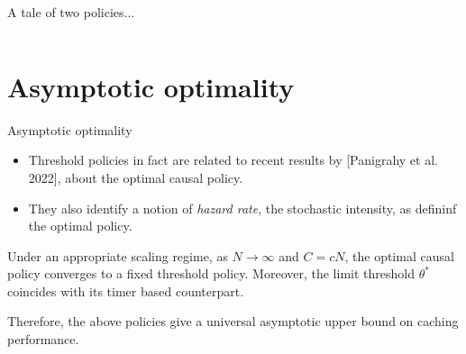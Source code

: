 \documentclass[aspectratio=169]{beamer}
\begin{document}
\begin{frame}{A tale of two policies...}
\begin{columns}
\begin{column}{0.65\textwidth}
		\end{column}
		\begin{column}{0.35\textwidth}

		\end{column}
	\end{columns}

\end{frame}

\section{Asymptotic optimality}

\begin{frame}{Asymptotic optimality}

	\begin{itemize}

		\item Threshold policies in fact are related to recent results by [Panigrahy et al. 2022], about the optimal causal policy.
		
		\item They also identify a notion of \emph{hazard rate}, the stochastic intensity, as defininf the optimal policy.

	\end{itemize}

	\pause
	\vfill

	\begin{theorem}

		Under an appropriate scaling regime, as $N\to\infty$ and $C=cN$, the optimal causal policy converges to a \alert{fixed threshold policy}. Moreover, the limit threshold $\theta^*$ coincides with its timer based counterpart.
	\end{theorem}
	
	\vfill
	
	Therefore, the above policies give a \alert{universal asymptotic upper bound} on caching performance.
\end{frame}
\end{document}
